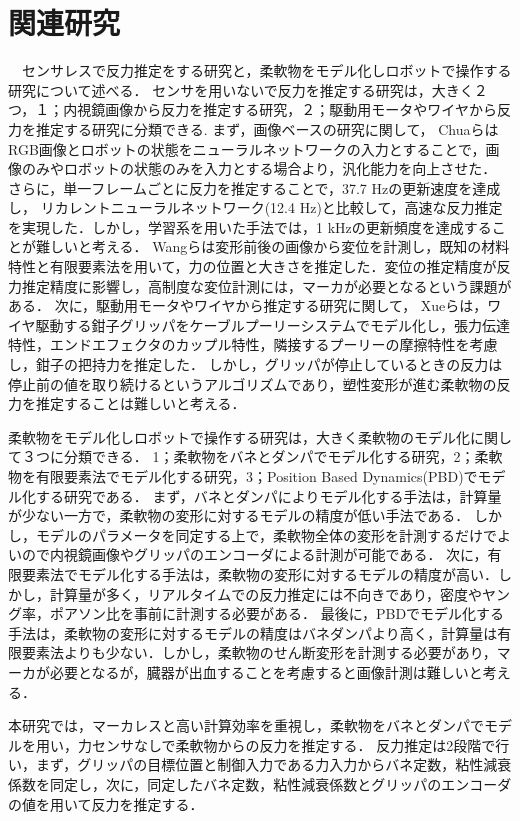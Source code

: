 \documentclass[a4paper]{jarticle}
\begin{document}
\section{関連研究}
　センサレスで反力推定をする研究と，柔軟物をモデル化しロボットで操作する研究について述べる．
センサを用いないで反力を推定する研究は，大きく２つ，１；内視鏡画像から反力を推定する研究，２；駆動用モータやワイヤから反力を推定する研究に分類できる.
まず，画像ベースの研究に関して，
ChuaらはRGB画像とロボットの状態をニューラルネットワークの入力とすることで，画像のみやロボットの状態のみを入力とする場合より，汎化能力を向上させた\cite{ref_Chua}．
さらに，単一フレームごとに反力を推定することで，37.7 Hzの更新速度を達成し，
リカレントニューラルネットワーク(12.4 Hz)と比較して，高速な反力推定を実現した．しかし，学習系を用いた手法では，1 kHzの更新頻度を達成することが難しいと考える．
Wangらは変形前後の画像から変位を計測し，既知の材料特性と有限要素法を用いて，力の位置と大きさを推定した\cite{ref_Wang}．変位の推定精度が反力推定精度に影響し，高制度な変位計測には，マーカが必要となるという課題がある．
次に，駆動用モータやワイヤから推定する研究に関して，
Xueらは，ワイヤ駆動する鉗子グリッパをケーブルプーリーシステムでモデル化し，張力伝達特性，エンドエフェクタのカップル特性，隣接するプーリーの摩擦特性を考慮し，鉗子の把持力を推定した\cite{ref_Xue}．
しかし，グリッパが停止しているときの反力は停止前の値を取り続けるというアルゴリズムであり，塑性変形が進む柔軟物の反力を推定することは難しいと考える．

柔軟物をモデル化しロボットで操作する研究は，大きく柔軟物のモデル化に関して３つに分類できる\cite{ref_review_modeling}．
1；柔軟物をバネとダンパでモデル化する研究，2；柔軟物を有限要素法でモデル化する研究，3；Position Based Dynamics(PBD)でモデル化する研究である．
まず，バネとダンパによりモデル化する手法は，計算量が少ない一方で，柔軟物の変形に対するモデルの精度が低い手法である\cite{ref_MSD}．
しかし，モデルのパラメータを同定する上で，柔軟物全体の変形を計測するだけでよいので内視鏡画像やグリッパのエンコーダによる計測が可能である．
次に，有限要素法でモデル化する手法は，柔軟物の変形に対するモデルの精度が高い\cite{ref_FEM}．しかし，計算量が多く，リアルタイムでの反力推定には不向きであり，密度やヤング率，ポアソン比を事前に計測する必要がある．
最後に，PBDでモデル化する手法は，柔軟物の変形に対するモデルの精度はバネダンパより高く，計算量は有限要素法よりも少ない\cite{ref_PBD}．しかし，柔軟物のせん断変形を計測する必要があり，マーカが必要となるが，臓器が出血することを考慮すると画像計測は難しいと考える．

本研究では，マーカレスと高い計算効率を重視し，柔軟物をバネとダンパでモデルを用い，力センサなしで柔軟物からの反力を推定する．
反力推定は2段階で行い，まず，グリッパの目標位置と制御入力である力入力からバネ定数，粘性減衰係数を同定し，次に，同定したバネ定数，粘性減衰係数とグリッパのエンコーダの値を用いて反力を推定する．
\end{document}
